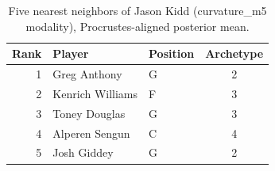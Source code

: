 \begin{table}[htbp]
  \centering\small
  \begin{tabular}{rllc}
    \toprule
    Rank & Player & Position & Archetype \\
    \midrule
    1 & Greg Anthony & G & 2 \\
    2 & Kenrich Williams & F & 3 \\
    3 & Toney Douglas & G & 3 \\
    4 & Alperen Sengun & C & 4 \\
    5 & Josh Giddey & G & 2 \\
    \bottomrule
  \end{tabular}
  \caption{Five nearest neighbors of Jason Kidd (curvature_m5 modality), Procrustes-aligned posterior mean.}
  \label{tab:Jason_Kidd_neighbors_curvature_m5}
\end{table}

